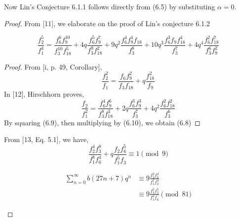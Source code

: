 Now Lin's Conjecture 6.1.1 follows directly from (6.5) by substituting $\alpha = 0$.

\begin{proof}
From [11], we elaborate on the proof of Lin's conjecture 6.1.2
\begin{lemma}
\begin{equation}
        \frac{f^5_2}{f^4_1} = \frac{f^6_6f^{10}_9}{f^{10}_3f^5_{18}} + 4q\frac{f^5_6f^7_9}{f^9_3f^2_{18}} + 9q^2\frac{f^4_6f^4_9f_{18}}{f^8_3} + 10q^3\frac{f^3_6f_9f^4_{18}}{f^7_3}+4q^4\frac{f^2_6f^7_{18}}{f^6_3f^2_9}
\end{equation}
\begin{proof}
From [i, p. 49, Corollary],
\begin{equation}
    \frac{f^2_2}{f_1} = \frac{f_6f^2_9}{f_3f_{18}} + q\frac{f^2_{18}}{f_9}
\end{equation}
In [12], Hirschhorn proves,
\begin{equation}
    \frac{f_2}{f^2_1} = \frac{f_6^4f_9^6}{f_3^8f_{18}^3} + 2q\frac{f^3_6f_9^3}{f^7_3}+4q^2\frac{f^2_6f^2_{18}}{f^6_3}
\end{equation}
By squaring (6.9), then multiplying by (6.10), we obtain (6.8)
\end{proof}
\end{lemma}

\begin{lemma}
From [13, Eq. 5.1], we have,
\begin{equation}
    \frac{f_2^4f_3^8}{f_1^8f_6^4} + q\frac{f_2f_6^5}{f_1^5f_3} \equiv 1 \pmod 9
\end{equation}
\end{lemma}

\begin{lemma}
\begin{equation}
\begin{split}
    \sum_{n = 0}^\infty b(27n + 7)q^n &\equiv 9\frac{f_3^2f_6^2}{f_1^1f_2^4} 
    \\&\equiv 9 \frac{f_3^2f_2^5}{f_1^4f_6} \pmod{81}
\end{split}
\end{equation}
\end{lemma}


\end{proof}
